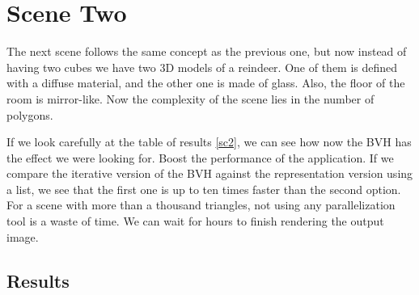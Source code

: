 \documentclass[titlepage,12pt]{report}
\begin{document}
\section{Scene Two}

The next scene follows the same concept as the previous one, but now instead of having two cubes we have two 3D models of a reindeer. One of them is defined with a diffuse material, and the other one is made of glass. Also, the floor of the room is mirror-like. Now the complexity of the scene lies in the number of polygons.

If we look carefully at the table of results \ref{sc2}, we can see how now the BVH has the effect we were looking for. Boost the performance of the application. If we compare the iterative version of the BVH against the representation version using a list, we see that the first one is up to ten times faster than the second option. For a scene with more than a thousand triangles, not using any parallelization tool is a waste of time. We can wait for hours to finish rendering the output image.

\subsection{Results}
\end{document}
